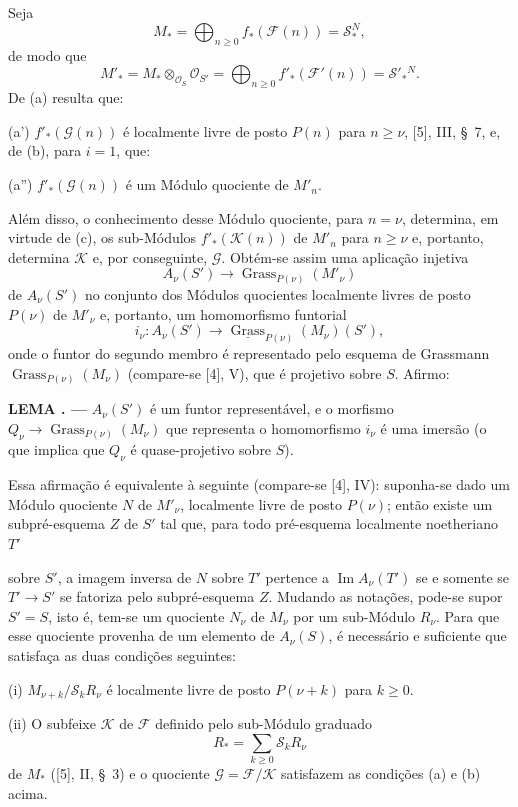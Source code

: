 \documentclass[11pt,twoside,openany]{book}
\numberwithin{equation}{section}
\newcommand{\src}[1]{%
  \phantomsection\hypertarget{src:#1}{}%
  \marginpar{\raggedleft\footnotesize\sffamily #1}%
}
\theoremstyle{plain}
\theoremstyle{definition}
\theoremstyle{remark}
\newcommand{\result}[2]{%
  \par\medskip\noindent\textbf{#1%
  \if\relax\detokenize{#2}\relax\else\space#2\fi. ---}\enspace
}
\newcommand{\FgaUnitKey}{frontmatter}
\renewcommand{\src}[1]{%
  \phantomsection\hypertarget{src:\FgaUnitKey:#1}{}%
  \marginpar{\raggedleft\footnotesize\sffamily #1}%
}
\begin{document}
Seja
\[
M_* =\bigoplus_{n\geq0}f_*(\mathcal F(n))=\mathcal S_*^{N},
\]
de modo que
\[
M'_* =M_*\otimes_{\mathcal O_S}\mathcal O_{S'}
=\bigoplus_{n\geq0}f'_*(\mathcal F'(n))=\mathcal S'_*{}^{N}.
\]
De (a) resulta que:

\noindent (a') $f'_*(\mathcal G(n))$ é localmente livre de posto $P(n)$ para
$n\geq\nu$, [5], III, \S~7, e, de (b), para $i=1$, que:

\noindent (a'') $f'_*(\mathcal G(n))$ é um Módulo quociente de $M'_n$.

Além disso, o conhecimento desse Módulo quociente, para $n=\nu$, determina,
em virtude de (c), os sub-Módulos $f'_*(\mathcal K(n))$ de $M'_n$ para
$n\geq\nu$ e, portanto, determina $\mathcal K$ e, por conseguinte, $\mathcal G$.
Obtém-se assim uma aplicação injetiva
\[
A_\nu(S')\longrightarrow\operatorname{Grass}_{P(\nu)}(M'_\nu)
\]
de $A_\nu(S')$ no conjunto dos Módulos quocientes localmente livres de posto
$P(\nu)$ de $M'_\nu$ e, portanto, um homomorfismo funtorial
\[
i_\nu:A_\nu(S')\longrightarrow
\underline{\operatorname{Grass}}_{P(\nu)}(M_\nu)(S'),
\]
onde o funtor do segundo membro é representado pelo esquema de Grassmann
$\operatorname{Grass}_{P(\nu)}(M_\nu)$ (compare-se [4], V), que é projetivo
sobre $S$. Afirmo:

\result{LEMA}{3.3} $A_\nu(S')$ é um funtor representável, e o morfismo
$Q_\nu\longrightarrow\operatorname{Grass}_{P(\nu)}(M_\nu)$ que representa o
homomorfismo $i_\nu$ é uma imersão (o que implica que $Q_\nu$ é
quase-projetivo sobre $S$).

Essa afirmação é equivalente à seguinte (compare-se [4], IV): suponha-se dado
um Módulo quociente $N$ de $M'_\nu$, localmente livre de posto $P(\nu)$; então
existe um subpré-esquema $Z$ de $S'$ tal que, para todo pré-esquema localmente
noetheriano $T'$
\src{262}
sobre $S'$, a imagem inversa de $N$ sobre $T'$ pertence a
$\operatorname{Im}A_\nu(T')$ se e somente se $T'\longrightarrow S'$ se
fatoriza pelo subpré-esquema $Z$. Mudando as notações, pode-se supor $S'=S$,
isto é, tem-se um quociente $N_\nu$ de $M_\nu$ por um sub-Módulo $R_\nu$.
Para que esse quociente provenha de um elemento de $A_\nu(S)$, é necessário e
suficiente que satisfaça as duas condições seguintes:

\medskip
\noindent (i) $M_{\nu+k}/\mathcal S_kR_\nu$ é localmente livre de posto
$P(\nu+k)$ para $k\geq0$.

\smallskip
\noindent (ii) O subfeixe $\mathcal K$ de $\mathcal F$ definido pelo
sub-Módulo graduado
\[
R_* =\sum_{k\geq0}\mathcal S_kR_\nu
\]
de $M_*$ ([5], II, \S~3) e o quociente $\mathcal G=\mathcal F/\mathcal K$
satisfazem as condições (a) e (b) acima.
\end{document}
